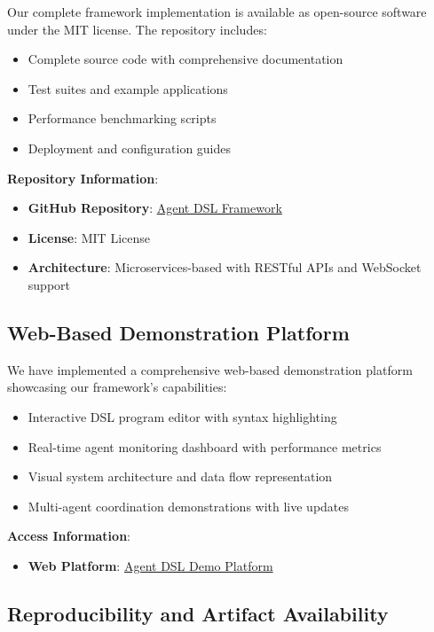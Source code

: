 \documentclass[conference]{IEEEtran}
\begin{document}
Our complete framework implementation is available as open-source software under the MIT license. The repository includes:

\begin{itemize}
\item Complete source code with comprehensive documentation
\item Test suites and example applications  
\item Performance benchmarking scripts
\item Deployment and configuration guides
\end{itemize}

\textbf{Repository Information}:
\begin{itemize}
\item \textbf{GitHub Repository}: \href{https://github.com/Max-YUAN-22/Agent_DSL}{Agent DSL Framework}
\item \textbf{License}: MIT License
\item \textbf{Architecture}: Microservices-based with RESTful APIs and WebSocket support
\end{itemize}

\subsection{Web-Based Demonstration Platform}

We have implemented a comprehensive web-based demonstration platform showcasing our framework's capabilities:

\begin{itemize}
\item Interactive DSL program editor with syntax highlighting
\item Real-time agent monitoring dashboard with performance metrics
\item Visual system architecture and data flow representation
\item Multi-agent coordination demonstrations with live updates
\end{itemize}

\textbf{Access Information}:
\begin{itemize}
\item \textbf{Web Platform}: \href{https://max-yuan-22.github.io/Agent_DSL/}{Agent DSL Demo Platform}
\end{itemize}

\subsection{Reproducibility and Artifact Availability}
\end{document}
